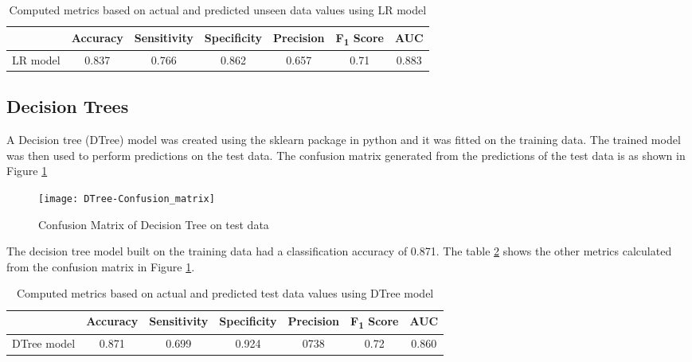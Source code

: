 \documentclass[11pt,openright]{report}
\begin{document}
\begin{table}[!htb]
	\renewcommand{\arraystretch}{1.3}
	\caption{Computed metrics based on actual and predicted unseen data values using LR model}
	\label{table:lr-unseen_metrics_db}
	\centering
	\begin{tabular}{|c|c|c|c|c|c|c|}
    \hline
  	 & \bfseries Accuracy & \bfseries Sensitivity & \bfseries Specificity & \bfseries Precision & \bfseries F\textsubscript{1} Score  & \bfseries AUC\\  
    \hline
	LR model & 0.837 & 0.766 & 0.862 & 0.657 & 0.71 & 0.883 \\ \hline
	\end{tabular} 
\end{table}

\subsection {Decision Trees}
A Decision tree (DTree) model was created using the sklearn package in python and it was fitted on the training data. The trained model was then used to perform predictions on the test data. The confusion matrix generated from the predictions of the test data is as shown in Figure \ref{fig:Dtree_confusion_matrix}

  \begin{figure}[!htb]
	\centering
	\texttt{[image: DTree-Confusion\_matrix]}
	\caption{Confusion Matrix of Decision Tree on test data}
	\label{fig:Dtree_confusion_matrix}
\end{figure} 

The decision tree model built on the training data had a classification accuracy of 0.871. The table \ref{table:Dtree_confusion_matrix} shows the other metrics calculated from the confusion matrix in Figure \ref{fig:Dtree_confusion_matrix}. 
\begin{table} [!htb]
	\renewcommand{\arraystretch}{1.3}
	\caption{Computed metrics based on actual and predicted test data values using DTree model}
	\label{table:Dtree_confusion_matrix}
	\centering
	\begin{tabular}{|c|c|c|c|c|c|c|}
    \hline
  	 & \bfseries Accuracy & \bfseries Sensitivity & \bfseries Specificity & \bfseries Precision & \bfseries F\textsubscript{1} Score  & \bfseries AUC\\  
    \hline
	DTree model & 0.871 & 0.699 & 0.924 & 0738 & 0.72 & 0.860 \\ \hline
	\end{tabular} 
\end{table}
\end{document}
